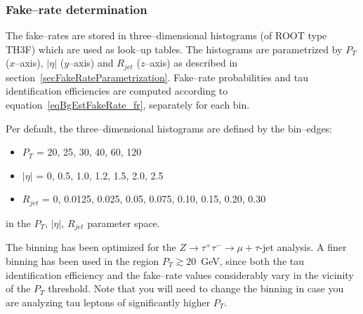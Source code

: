 \subsubsection{Fake--rate determination}
\label{secAppendixFakeRateDetermination}

The fake--rates are stored in three--dimensional histograms (of ROOT type TH3F)
which are used as look--up tables.
The histograms are parametrized by $P_{T}$ ($x$--axis), $\vert\eta\vert$ ($y$--axis) and $R_{jet}$ ($z$--axis)
as described in section~\ref{secFakeRateParametrization}.
Fake--rate probabilities and tau identification efficiencies
are computed according to equation~\ref{eqBgEstFakeRate_fr}, separately for each bin.

Per default, the three--dimensional histograms are defined by the bin--edges:
\begin{itemize}
\item $P_{T}$ = { 20, 25, 30, 40, 60, 120 }
\item $\vert\eta\vert$ = { 0, 0.5, 1.0, 1.2, 1.5, 2.0, 2.5 }
\item $R_{jet}$ = { 0, 0.0125, 0.025, 0.05, 0.075, 0.10, 0.15, 0.20, 0.30 }
\end{itemize}
in the $P_{T}$, $\vert\eta\vert$, $R_{jet}$ parameter space.

The binning has been optimized for the $Z \rightarrow \tau^{+} \tau^{-} \rightarrow \mu + \tau\mbox{-jet}$ analysis.  
A finer binning has been used in the region $P_{T} \gtrsim 20$~GeV, since both the tau identification efficiency
and the fake--rate values considerably vary in the vicinity of the $P_{T}$
threshold.  Note that you will need to change the binning in case you are
analyzing tau leptons of significantly higher $P_{T}$.

